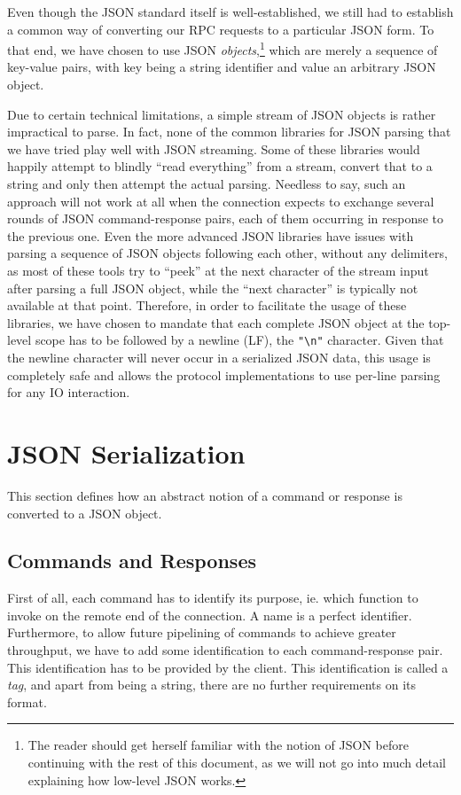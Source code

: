 \documentclass[deska]{subfiles}
\begin{document}
Even though the JSON standard itself is well-established, we still had to establish a common way of converting our RPC
requests to a particular JSON form. To that end, we have chosen to use JSON {\em objects},\footnote{The reader should get
herself familiar with the notion of JSON before continuing with the rest of this document, as we will not go into much
detail explaining how low-level JSON works.} which are merely a sequence of key-value pairs, with key being a string
identifier and value an arbitrary JSON object.  

Due to certain technical limitations, a simple stream of JSON objects is rather impractical to parse.  In fact, none of
the common libraries for JSON parsing that we have tried play well with JSON streaming.  Some of these libraries would
happily attempt to blindly ``read everything'' from a stream, convert that to a string and only then attempt the actual
parsing.  Needless to say, such an approach will not work at all when the connection expects to exchange several rounds
of JSON command-response pairs, each of them occurring in response to the previous one.  Even the more advanced JSON
libraries have issues with parsing a sequence of JSON objects following each other, without any delimiters, as most of
these tools try to ``peek'' at the next character of the stream input after parsing a full JSON object, while the ``next
character'' is typically not available at that point.  Therefore, in order to facilitate the usage of these libraries,
we have chosen to mandate that each complete JSON object at the top-level scope has to be followed by a newline (LF),
the {\tt "\textbackslash n"} character.  Given that the newline character will never occur in a serialized JSON data,
this usage is completely safe and allows the protocol implementations to use per-line parsing for any IO interaction.

\section{JSON Serialization}

This section defines how an abstract notion of a command or response is converted to a JSON object.

\subsection{Commands and Responses}

First of all, each command has to identify its purpose, ie. which function to invoke on the remote end of the
connection.  A name is a perfect identifier.  Furthermore, to allow future pipelining of commands to achieve greater
throughput, we have to add some identification to each command-response pair.  This identification has to be provided by
the client.  This identification is called a {\em tag}, and apart from being a string, there are no further
requirements on its format.
\end{document}
